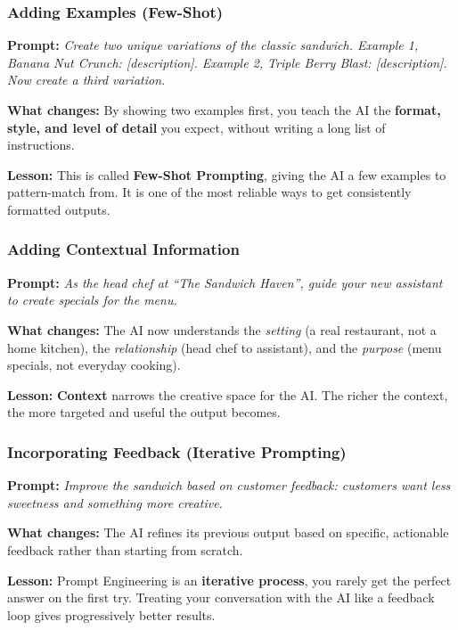 \begin{frame}[fragile]\frametitle{Adding Examples (Few-Shot)}

\textbf{Prompt:} \emph{Create two unique variations of the classic sandwich.
Example 1, Banana Nut Crunch: [description].
Example 2, Triple Berry Blast: [description]. Now create a third variation.}

\medskip
\textbf{What changes:} By showing two examples first, you teach the AI the \textbf{format, style, and level of detail} you expect, without writing a long list of instructions.

\medskip
\textbf{Lesson:} This is called \textbf{Few-Shot Prompting}, giving the AI a few examples to pattern-match from. It is one of the most reliable ways to get consistently formatted outputs.

\end{frame}

\begin{frame}[fragile]\frametitle{Adding Contextual Information}

\textbf{Prompt:} \emph{As the head chef at ``The Sandwich Haven'', guide your new assistant to create specials for the menu.}

\medskip
\textbf{What changes:} The AI now understands the \emph{setting} (a real restaurant, not a home kitchen), the \emph{relationship} (head chef to assistant), and the \emph{purpose} (menu specials, not everyday cooking).

\medskip
\textbf{Lesson:} \textbf{Context} narrows the creative space for the AI. The richer the context, the more targeted and useful the output becomes.

\end{frame}

\begin{frame}[fragile]\frametitle{Incorporating Feedback (Iterative Prompting)}

\textbf{Prompt:} \emph{Improve the sandwich based on customer feedback: customers want less sweetness and something more creative.}

\medskip
\textbf{What changes:} The AI refines its previous output based on specific, actionable feedback rather than starting from scratch.

\medskip
\textbf{Lesson:} Prompt Engineering is an \textbf{iterative process}, you rarely get the perfect answer on the first try. Treating your conversation with the AI like a feedback loop gives progressively better results.

\end{frame}

